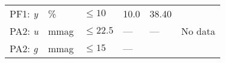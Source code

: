 \documentclass[DM,lsstdraft,toc]{lsstdoc}
\begin{document}
\begin{longtable}[]{@{}llllll@{}}
\begin{minipage}[t]{0.14\columnwidth}
PF1: \emph{y}\strut
\end{minipage} & \begin{minipage}[t]{0.06\columnwidth}\raggedright\strut
\%\strut
\end{minipage} & \begin{minipage}[t]{0.17\columnwidth}\raggedright\strut
\(\leq 10\)\strut
\end{minipage} & \begin{minipage}[t]{0.17\columnwidth}\raggedright\strut
10.0\strut
\end{minipage} & \begin{minipage}[t]{0.12\columnwidth}\raggedright\strut
38.40\strut
\end{minipage} & \begin{minipage}[t]{0.17\columnwidth}\raggedright\strut
\strut
\end{minipage}\tabularnewline
\begin{minipage}[t]{0.14\columnwidth}\raggedright\strut
PA2: \emph{u}\strut
\end{minipage} & \begin{minipage}[t]{0.06\columnwidth}\raggedright\strut
mmag\strut
\end{minipage} & \begin{minipage}[t]{0.17\columnwidth}\raggedright\strut
\(\leq 22.5\)\strut
\end{minipage} & \begin{minipage}[t]{0.17\columnwidth}\raggedright\strut
---\strut
\end{minipage} & \begin{minipage}[t]{0.12\columnwidth}\raggedright\strut
---\strut
\end{minipage} & \begin{minipage}[t]{0.17\columnwidth}\raggedright\strut
No data\strut
\end{minipage}\tabularnewline
\begin{minipage}[t]{0.14\columnwidth}\raggedright\strut
PA2: \emph{g}\strut
\end{minipage} & \begin{minipage}[t]{0.06\columnwidth}\raggedright\strut
mmag\strut
\end{minipage} & \begin{minipage}[t]{0.17\columnwidth}\raggedright\strut
\(\leq 15\)\strut
\end{minipage} & \begin{minipage}[t]{0.17\columnwidth}\raggedright\strut
---\strut
\end{minipage} & \begin{minipage}[t]{0.12\columnwidth}\raggedright\strut

\end{minipage}
\end{longtable}
\end{document}
